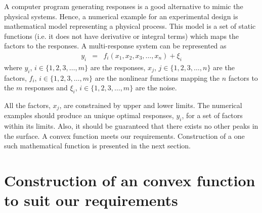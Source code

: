 \documentclass[letterpaper, 12pt]{article}
\begin{document}
A computer program generating responses is a good alternative to mimic the physical systems. Hence, a numerical example for an experimental design is mathematical model representing a physical process. This model is a set of static functions (i.e. it does not have derivative or integral terms) which maps the factors to the responses. A multi-response system can be represented as
\begin{eqnarray}
y_i &=& f_i(x_1, x_2, x_3, \dots, x_n) + \xi_i \label{Eqn:Function}
\end{eqnarray}
\noindent where $y_i$, $i\in \{1,2,3, \dots, m\}$ are the responses, $x_j$, $j\in \{1,2,3, \dots, n\}$ are the factors, $f_i$, $i\in \{1,2,3, \dots, m\}$ are the nonlinear functions mapping the $n$ factors to the $m$ responses and $\xi_i$, $i\in \{1,2,3, \dots, m\}$ are the noise.
\par
All the factors, $x_j$, are constrained by upper and lower limits. The numerical examples should produce an unique optimal responses, $y_i$, for a set of factors within its limits. Also, it should be guaranteed that there exists no other peaks in the surface. A convex function meets our requirements. Construction of a one such mathematical function is presented in the next section.
\section{Construction of an convex function to suit our requirements}
\end{document}
